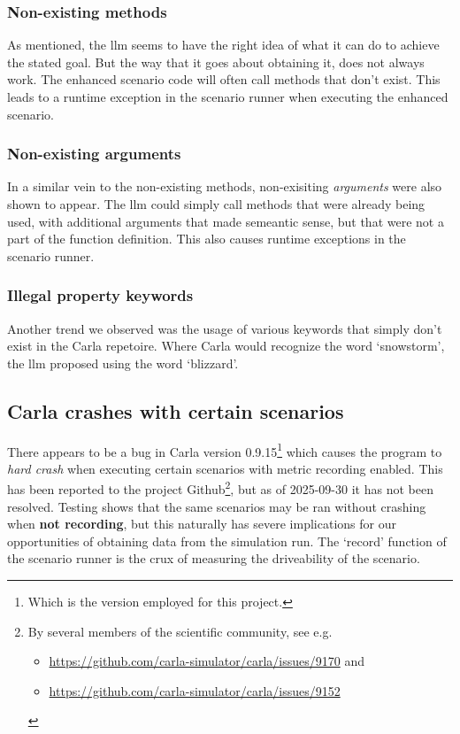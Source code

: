 \subsubsection{Non-existing methods}

As mentioned, the \acrshort{llm} seems to have the right idea of what it can do
to achieve the stated goal. But the way that it goes about obtaining it, does
not always work. The enhanced scenario code will often call methods that don't
exist. This leads to a runtime exception in the scenario runner when executing
the enhanced scenario. 

\subsubsection{Non-existing arguments}

In a similar vein to the non-existing methods, non-exisiting \emph{arguments}
were also shown to appear. The \acrshort{llm} could simply call methods that
were already being used, with additional arguments that made semeantic sense,
but that were not a part of the function definition. This also causes runtime
exceptions in the scenario runner.

\subsubsection{Illegal property keywords}

Another trend we observed was the usage of various keywords that simply don't
exist in the Carla repetoire. Where Carla would recognize the word `snowstorm',
the \acrfull{llm} proposed using the word `blizzard'.


\subsection{Carla crashes with certain scenarios}

There appears to be a bug in Carla version 0.9.15\footnote{Which is the version
employed for this project.} which causes the program to \emph{hard crash} when
executing certain scenarios with metric recording enabled. This has been
reported to the project Github\footnote{By several members of the scientific community, see e.g.
\begin{itemize}\item  \url{https://github.com/carla-simulator/carla/issues/9170} and \item \url{https://github.com/carla-simulator/carla/issues/9152}\end{itemize}}, but as of 2025-09-30 it has not been resolved.
Testing shows that the same scenarios may be ran without crashing when
\textbf{not recording}, but this naturally has severe implications for our
opportunities of obtaining data from the simulation run. The `record' function
of the scenario runner is the crux of measuring the driveability of the
scenario. 


